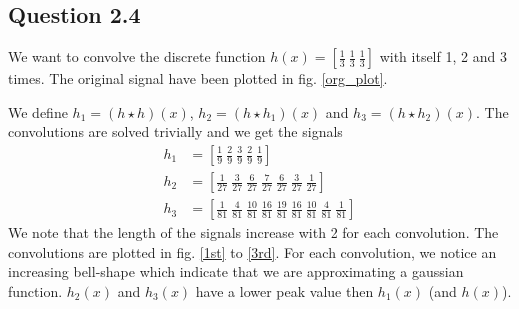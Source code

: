 \documentclass[a4paper, 10pt, final]{article}
\begin{document}
\subsection*{Question 2.4}
We want to convolve the discrete function $h(x) =
[\frac{1}{3}~\frac{1}{3}~\frac{1}{3}]$ with itself 1, 2 and 3 times. The
original signal have been plotted in fig. \ref{org_plot}.

We define $h_1 = (h \star h)(x)$, $h_2 = (h \star h_1)(x)$ and $h_3 = (h
\star h_2)(x)$. The convolutions are solved trivially and we get the
signals
\begin{align}
    h_1 & =
    \left[\frac{1}{9}~\frac{2}{9}~\frac{3}{9}~\frac{2}{9}~\frac{1}{9}\right]\\
    h_2 & =
    \left[\frac{1}{27}~\frac{3}{27}~\frac{6}{27}~\frac{7}{27}~\frac{6}{27}~\frac{3}{27}~\frac{1}{27}\right]\\
    h_3 & =
    \left[\frac{1}{81}~\frac{4}{81}~\frac{10}{81}~\frac{16}{81}~\frac{19}{81}~\frac{16}{81}~\frac{10}{81}~\frac{4}{81}~\frac{1}{81}\right]
\end{align}
We note that the length of the signals increase with 2 for each
convolution. The convolutions are plotted in fig. \ref{1st} to
\ref{3rd}. For each convolution, we notice an increasing bell-shape
which indicate that we are approximating a gaussian function.  $h_2(x)$
and $h_3(x)$ have a lower peak value then $h_1(x)$ (and $h(x)$).
\end{document}
